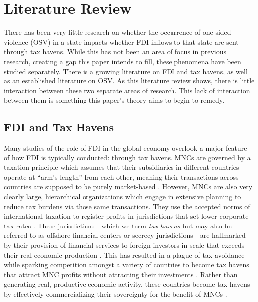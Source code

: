 \documentclass[11pt, titlepage]{article} %
\begin{document}
\section*{Literature Review}

There has been very little research on whether the occurrence of one-sided violence (OSV) in a state impacts whether FDI inflows to that state are sent through tax havens. While this has not been an area of focus in previous research, creating a gap this paper intends to fill, these phenomena have been studied separately. There is a growing literature on FDI and tax havens, as well as an established literature on OSV. As this literature review shows, there is little interaction between these two separate areas of research. This lack of interaction between them is something this paper’s theory aims to begin to remedy.

\subsection*{FDI and Tax Havens}

Many studies of the role of FDI in the global economy overlook a major feature of how FDI is typically conducted: through tax havens. MNCs are governed by a taxation principle which assumes that their subsidiaries in different countries operate at ``arm’s length” from each other, meaning their transactions across countries are supposed to be purely market-based \parencite{keenCorporateTaxationGlobal2019}. However, MNCs are also very clearly large, hierarchical organizations which engage in extensive planning to reduce tax burdens via those same transactions. They use the accepted norms of international taxation to register profits in jurisdictions that set lower corporate tax rates \parencite{wangCorporateTaxAvoidance2020}. These jurisdictions---which we term \textit{tax havens} but may also be referred to as offshore financial centers or secrecy jurisdictions---are hallmarked by their provision of financial services to foreign investors in scale that exceeds their real economic production \parencite{zoromeConceptOffshoreFinancial2007}. This has resulted in a plague of tax avoidance \parencite{torslovMissingProfitsNations2023} while sparking competition amongst a variety of countries to become tax havens that attract MNC profits without attracting their investments \parencite{garcia-bernardoUncoveringOffshoreFinancial2017}. Rather than generating real, productive economic activity, these countries become tax havens by effectively commercializing their sovereignty for the benefit of MNCs \parencite{palanTaxHavensCommercialization2002}. 
\end{document}
